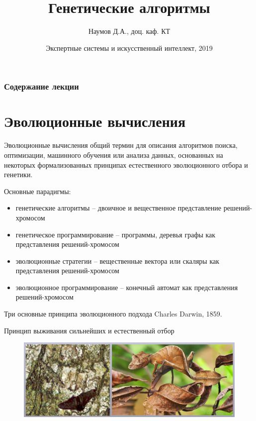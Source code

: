 \documentclass{beamer}
\title[Artifical Intelligence]{Генетические алгоритмы}
\author{Наумов Д.А., доц. каф. КТ}
\date[08.10.2019] {Экспертные системы и искусственный интеллект, 2019}
\begin{document}
\begin{frame}
  \titlepage
\end{frame}
  
\begin{frame}
  \frametitle{Содержание лекции}
  \tableofcontents  
\end{frame}

\section{Эволюционные вычисления}
\begin{frame}
\begin{block}{Эволюционные вычисления }
общий термин для описания алгоритмов поиска, оптимизации, машинного обучения или анализа данных, основанных на некоторых формализованных принципах естественного эволюционного отбора и генетики.
\end{block}
Основные парадигмы:
\begin{itemize}
\item генетические алгоритмы – двоичное и вещественное представление решений-хромосом
\item генетическое программирование – программы, деревья графы как представления решений-хромосом
\item эволюционные стратегии – вещественные вектора или
скаляры как представления решений-хромосом
\item эволюционное программирование – конечный автомат как представления решений-хромосом
\end{itemize}
\end{frame}

\begin{frame}{Три основные принципа эволюционного подхода}
Charles Darwin, 1859. 

Принцип выживания сильнейших и естественный отбор
\begin{figure}[h]
\centering
\includegraphics[scale=0.4]{images/lec04-pic01.png}
\end{figure}
\end{frame}
\end{document}

